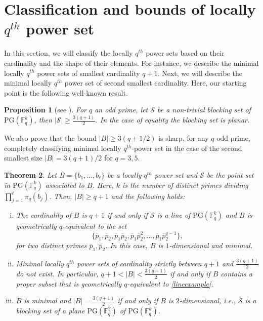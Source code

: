 \documentclass[12pt]{amsart}
\newtheorem{theorem}{Theorem}[section]
\newtheorem{proposition}[theorem]{Proposition}
\newcommand{\F}{{\mathbb F}}
\newcommand{\PG}{\mathrm{PG}}
\begin{document}
\section{Classification and bounds of locally $q^{th}$ power set} \label{section:classification}
In this section, we will classify the locally $q^{th}$ power sets based on their cardinality and the shape of their elements. For instance, we describe the minimal locally $q^{th}$ power sets of smallest cardinality $q+1$. Next, we will describe the minimal locally $q^{th}$ power set of second smallest cardinality. Here, our starting point is the following well-known result. 

\begin{proposition}[see \cite{blokhuis1994size,heim1996blockierende}]
\label{th:secondminimumsizeblockingset} For $q$ an odd prime, let $\mathcal{S}$ be a non-trivial blocking set of $\PG(\F_{q}^{k})$, then 
$\lvert \mathcal{S} \rvert \geq \frac{3(q+1)}{2}$. In the case of equality the blocking set is planar.
\end{proposition}
We also prove that the bound $\lvert B \rvert \geq 3(q+1/2)$ is sharp, for any $q$ odd prime, completely classifying minimal locally $q^{th}$-power set in the case of the second smallest size $\lvert B \rvert=3(q+1)/2$ for $q=3,5$.


\begin{theorem} \label{th:classification}
    Let $B=\{b_1, \ldots, b_{\ell}\}$ be a locally $q^{th}$ power set and $\mathcal{S}$ be the point set in $\PG(\F_{q}^{k})$ associated to $B$. Here, $k$ is the number of distinct primes dividing $\prod_{j=1}^{\ell} \pi_{q}(b_{j})$. Then, $\lvert B \rvert \geq q+1$ and the following holds:
    \begin{enumerate}[i)]
        \item The cardinality of $B$ is $q+1$ if and only if $\mathcal{S}$ is a line of $\PG(\F_{q}^{k})$ and $B$ is geometrically $q$-equivalent to the set
        \begin{equation}
        \{\overline{p}_1, \overline{p}_2, \overline{p}_1\overline{p}_2, \overline{p}_1\overline{p}_2^2, \ldots, \overline{p}_1\overline{p}_2^{q-1}\}, \label{lineexample}
        \end{equation}
    for two distinct primes $\overline{p}_1,\overline{p}_2$. In this case, $B$ is $1$-dimensional and minimal. \vspace{2mm}
    
        \item Minimal locally $q^{th}$ power sets of cardinality strictly between $q+1$ and $\frac{3(q+1)}{2}$ do not exist. In particular, $q+1 < \lvert B \rvert < \frac{3(q+1)}{2}$ if and only if $B$ contains a proper subset that is geometrically $q$-equivalent to \eqref{lineexample}. \vspace{2mm}
        
        \item $B$ is minimal and $\lvert B \rvert=\frac{3(q+1)}{2}$ if and only if $B$ is $2$-dimensional, i.e., $\mathcal{S}$ is a blocking set of a plane $\PG(\F_{q}^{2})$ of $\PG(\F_{q}^{k})$. 
    \end{enumerate}
\end{theorem}
\end{document}
